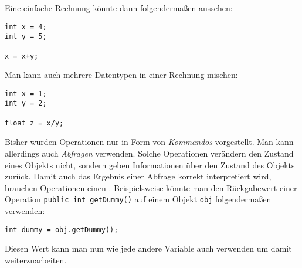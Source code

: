 \begin{Infobox}
Eine einfache Rechnung könnte dann folgendermaßen aussehen:

\begin{lstlisting}[numbers=none]
int x = 4;
int y = 5;

x = x+y;
\end{lstlisting}

Man kann auch mehrere Datentypen in einer Rechnung mischen:\\

\begin{lstlisting}[numbers=none]
int x = 1;
int y = 2;

float z = x/y;
\end{lstlisting}

\end{Infobox}

\begin{Infobox}

Bisher wurden Operationen nur in Form von \textit{Kommandos} vorgestellt.
Man kann allerdings auch \textit{Abfragen} verwenden.
Solche Operationen verändern den Zustand eines Objekts nicht, sondern geben Informationen über den Zustand des Objekts zurück.
Damit auch das Ergebnis einer Abfrage korrekt interpretiert wird, brauchen Operationen einen .
Beispielsweise könnte man den Rückgabewert einer Operation \lstinline|public int getDummy()| auf einem Objekt \lstinline|obj| folgendermaßen verwenden:

\begin{lstlisting}[numbers=none]
int dummy = obj.getDummy();
\end{lstlisting}

Diesen Wert kann man nun wie jede andere Variable auch verwenden um damit weiterzuarbeiten.

\end{Infobox}

\addexcercise

